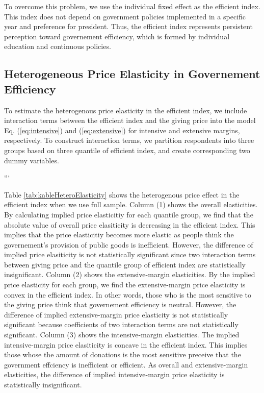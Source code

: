 \documentclass[
  11pt,
  a4paper,
]{article}
\begin{document}
  To overcome this problem, we use the individual fixed effect as the efficient index.
  This index does not depend on government policies implemented in a specific year and preference for president.
  Thus, the efficient index represents persistent perception toward governement efficiency,
  which is formed by individual education and continuous policies.

  \hypertarget{heterogeneous-price-elasticity-in-governement-efficiency}{%
  \subsection{Heterogeneous Price Elasticity in Governement Efficiency}\label{heterogeneous-price-elasticity-in-governement-efficiency}}

  To estimate the heterogenous price elasticity in the efficient index,
  we include interaction terms between the efficient index and the giving price
  into the model Eq. (\eqref{eq:intensive}) and (\eqref{eq:extensive}) for intensive and extensive margins, respectively.
  To construct interaction terms, we partition respondents into three groups based on three quantile of efficient index,
  and create corresponding two dummy variables.

  ```

  Table \ref{tab:kableHeteroElasticity} shows the heterogenous price effect in the efficient index
  when we use full sample.
  Column (1) shows the overall elasticities.
  By calculating implied price elasticitiy for each quantile group,
  we find that the absolute value of overall price elasiticity is decreasing in the efficient index.
  This implies that the price elasticitiy becomes more elastic
  as people think the governement's provision of public goods is inefficient.
  However,
  the difference of implied price elasiticity is not statistically significant
  since two interaction terms between giving price and the quantile group of efficient index are statistically insignificant.
  Column (2) shows the extensive-margin elasticities.
  By the implied price elasticity for each group,
  we find the extensive-margin price elasticity is convex in the efficient index.
  In other words, those who is the most sensitive to the giving price think that
  governement efficiency is neutral.
  However, the difference of implied extensive-margin price elasticity is not statistically significant
  because coefficients of two interaction terms are not statistically significant.
  Column (3) shows the intensive-margin elasticities.
  The implied intensive-margin price elasiticity is concave in the efficient index.
  This implies those whose the amount of donations is the most sensitive preceive that
  the government effciency is inefficient or efficient.
  As overall and extensive-margin elasticities,
  the difference of implied intensive-margin price elasticity is statistically insignificant.
\end{document}
